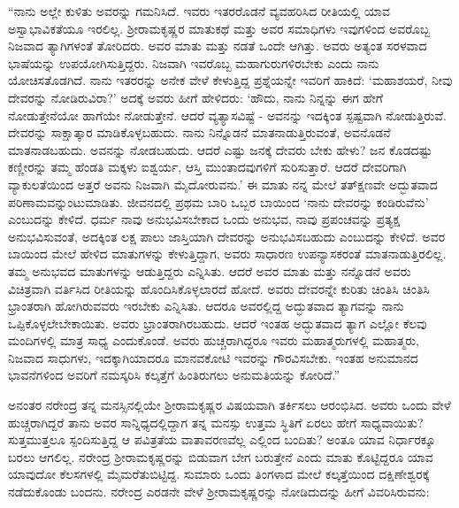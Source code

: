 \vskip  3pt

“ನಾನು ಅಲ್ಲೇ ಕುಳಿತು ಅವರನ್ನು ಗಮನಿಸಿದೆ. ಇವರು ಇತರರೊಡನೆ ವ್ಯವಹರಿಸಿದ ರೀತಿಯಲ್ಲಿ ಯಾವ ಅಸ್ವಾಭಾವಿಕತೆಯೂ ಇರಲಿಲ್ಲ. ಶ‍್ರೀರಾಮಕೃಷ್ಣರ ಮಾತುಕಥೆ ಮತ್ತು ಅವರ ಸಮಾಧಿಗಳು ಇವುಗಳಿಂದ ಅವರೊಬ್ಬ ನಿಜವಾದ ತ್ಯಾಗಿಗಳಂತೆ ತೋರಿದರು. ಅವರ ಮಾತು ಮತ್ತು ನಡತೆ ಒಂದೇ ಆಗಿತ್ತು. ಅವರು ಅತ್ಯಂತ ಸರಳವಾದ ಭಾಷೆಯನ್ನು ಉಪಯೋಗಿಸುತ್ತಿದ್ದರು. ನಿಜವಾಗಿ ಇವರೊಬ್ಬ ಮಹಾಗುರುಗಳಿರಬೇಕು ಎಂದು ನಾನು ಯೋಚಿಸತೊಡಗಿದೆ. ನಾನು ಇತರರನ್ನು ಅನೇಕ ವೇಳೆ ಕೇಳುತ್ತಿದ್ದ ಪ್ರಶ್ನೆಯನ್ನೇ ಇವರಿಗೆ ಹಾಕಿದೆ: ‘ಮಹಾಶಯರೆ, ನೀವು ದೇವರನ್ನು ನೋಡಿರುವಿರಾ?’ ಅದಕ್ಕೆ ಅವರು ಹೀಗೆ ಹೇಳಿದರು: ‘ಹೌದು, ನಾನು ನಿನ್ನನ್ನು ಈಗ ಹೇಗೆ ನೋಡುತ್ತೇನೆಯೋ ಹಾಗೆಯೇ ನೋಡುತ್ತೇನೆ. ಆದರೆ ವ್ಯತ್ಯಾಸವಿಷ್ಟೆ - ಅವನನ್ನು ಇದಕ್ಕಿಂತ ಸ್ಪಷ್ಟವಾಗಿ ನೋಡುತ್ತಿರುವೆ. ದೇವರನ್ನು ಸಾಕ್ಷಾತ್ಕಾರ ಮಾಡಿಕೊಳ್ಳಬಹುದು. ನಾನು ನಿನ್ನೊಡನೆ ಮಾತನಾಡುತ್ತಿರುವಂತೆ, ಅವನೊಡನೆ ಮಾತನಾಡಬಹುದು. ಅವನನ್ನು ನೋಡಬಹುದು. ಆದರೆ ಎಷ್ಟು ಜನಕ್ಕೆ ದೇವರು ಬೇಕು ಹೇಳು? ಜನ ಕೊಡದಷ್ಟು ಕಣ್ಣೀರನ್ನು ತಮ್ಮ ಹೆಂಡತಿ ಮಕ್ಕಳು ಐಶ್ವರ್ಯ, ಆಸ್ತಿ ಮುಂತಾದವುಗಳಿಗೆ ಸುರಿಸುತ್ತಾರೆ. ಆದರೆ ದೇವರಿಗಾಗಿ ವ್ಯಾಕುಲತೆಯಿಂದ ಅತ್ತರೆ ಅವನು ನಿಜವಾಗಿ ಮೈದೋರುವನು.’ ಈ ಮಾತು ನನ್ನ ಮೇಲೆ ತತ್‍ಕ್ಷಣವೇ ಅದ್ಭುತವಾದ ಪರಿಣಾಮವನ್ನುಂಟುಮಾಡಿತು. ಜೀವನದಲ್ಲಿ ಪ್ರಥಮ ಬಾರಿ ಒಬ್ಬರ ಬಾಯಿಂದ ‘ನಾನು ದೇವರನ್ನು ಕಂಡಿರುವೆನು’ ಎಂಬುದನ್ನು ಕೇಳಿದೆ. ಧರ್ಮ ನಾವು ಅನುಭವಿಸಬೇಕಾದ ಒಂದು ಅನುಭವ, ನಾವು ಪ್ರಪಂಚವನ್ನು ಪ್ರತ್ಯಕ್ಷ ಅನುಭವಿಸುವಂತೆ, ಅದಕ್ಕಿಂತ ಲಕ್ಷ ಪಾಲು ಜಾಸ್ತಿಯಾಗಿ ದೇವರನ್ನು ಅನುಭವಿಸಬಹುದು ಎಂಬುದನ್ನು ಕೇಳಿದೆ. ಅವರ ಬಾಯಿಂದ ಮೇಲೆ ಹೇಳಿದ ಮಾತುಗಳನ್ನು ಕೇಳುತ್ತಿದ್ದಾಗ, ಅವರು ಸಾಧಾರಣ ಉಪನ್ಯಾಸಕರಂತೆ ಮಾತನಾಡುತ್ತಿರಲಿಲ್ಲ. ತಮ್ಮ ಅನುಭವದ ಮಾತುಗಳನ್ನು ಆಡುತ್ತಿದ್ದರು ಎನ್ನಿಸಿತು. ಆದರೆ ಅವರ ಮಾತು ಮತ್ತು ನನ್ನೊಡನೆ ಅವರು ವಿಚಿತ್ರವಾಗಿ ವರ್ತಿಸಿದ ರೀತಿಯನ್ನು ಹೊಂದಿಸಿಕೊಳ್ಳಲಾರದೆ ಹೋದೆ. ಅವರು ದೇವರನ್ನೇ ಕುರಿತು ಚಿಂತಿಸಿ ಚಿಂತಿಸಿ ಭ್ರಾಂತರಾಗಿ ಹೋಗಿರುವವರು ಇರಬೇಕು ಎನ್ನಿಸಿತು. ಆದರೂ ಅವರಲ್ಲಿದ್ದ ಅದ್ಭುತವಾದ ತ್ಯಾಗವನ್ನು ನಾನು ಒಪ್ಪಿಕೊಳ್ಳಲೇಬೇಕಾಯಿತು. ಅವರು ಭ್ರಾಂತರಾಗಿರಬಹುದು. ಆದರೆ ಇಂತಹ ಅದ್ಭುತವಾದ ತ್ಯಾಗ ಎಲ್ಲೋ ಕೆಲವು ಮಂದಿಗಳಲ್ಲಿ ಮಾತ್ರ ಸಾಧ್ಯ ಎಂದುಕೊಂಡೆ. ಅವರು ಹುಚ್ಚರಾಗಿದ್ದರೂ ಇವರು ಮಹಾತ್ಮರುಗಳಲ್ಲಿ ಮಹಾತ್ಮರು, ನಿಜವಾದ ಸಾಧುಗಳು, ಇದಕ್ಕಾಗಿಯಾದರೂ ಮಾನವಕೋಟಿ ಇವರನ್ನು ಗೌರವಿಸಬೇಕು. ಇಂತಹ ಅನುಮಾನದ ಭಾವನೆಗಳಿಂದ ಅವರಿಗೆ ನಮಸ್ಕರಿಸಿ ಕಲ್ಕತ್ತೆಗೆ ಹಿಂತಿರುಗಲು ಅನುಮತಿಯನ್ನು ಕೋರಿದೆ.”

\vskip  3pt

ಅನಂತರ ನರೇಂದ್ರ ತನ್ನ ಮನಸ್ಸಿನಲ್ಲಿಯೇ ಶ‍್ರೀರಾಮಕೃಷ್ಣರ ವಿಷಯವಾಗಿ ತರ್ಕಿಸಲು ಆರಂಭಿಸಿದ. ಅವರು ಒಂದು ವೇಳೆ ಹುಚ್ಚರಾಗಿದ್ದರೆ ತಾನು ಅವರ ಸಾನ್ನಿಧ್ಯದಲ್ಲಿದ್ದಾಗ ತನ್ನ ಮನಸ್ಸು ಉತ್ತಮ ಸ್ಥಿತಿಗೆ ಏರಲು ಹೇಗೆ ಸಾಧ್ಯವಾಯಿತು? ಸುತ್ತಮುತ್ತಲೂ ಸ್ಪಂದಿಸುತ್ತಿದ್ದ ಆ ಪವಿತ್ರತೆಯ ವಾತಾವರಣವೆಲ್ಲ ಎಲ್ಲಿಂದ ಬಂದಿತು? ಅಂತೂ ಯಾವ ನಿರ್ಧಾರಕ್ಕೂ ಬರಲು ಆಗಲಿಲ್ಲ. ನರೇಂದ್ರ ಶ‍್ರೀರಾಮಕೃಷ್ಣರನ್ನು ಬಿಡುವಾಗ ಬೇಗ ಬರುತ್ತೇನೆ ಎಂದು ಮಾತು ಕೊಟ್ಟಿದ್ದರೂ ಯಾವ ಯಾವುದೋ ಕೆಲಸಗಳಲ್ಲಿ ಮೈಮರೆತುಬಿಟ್ಟಿದ್ದ. ಸುಮಾರು ಒಂದು ತಿಂಗಳಾದ ಮೇಲೆ ಕಲ್ಕತ್ತೆಯಿಂದ ದಕ್ಷಿಣೇಶ್ವರಕ್ಕೆ ನಡೆದುಕೊಂಡು ಬಂದನು. ನರೇಂದ್ರ ಎರಡನೇ ವೇಳೆ ಶ‍್ರೀರಾಮಕೃಷ್ಣರನ್ನು ನೋಡಿದುದನ್ನು ಹೀಗೆ ವಿವರಿಸಿರುವನು:

\vskip  3pt

